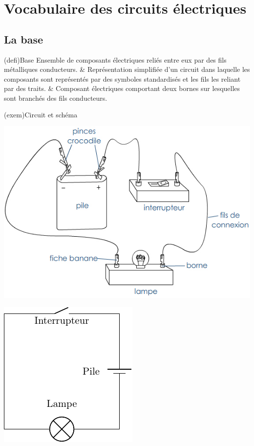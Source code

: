 \documentclass[../../main/main.tex]{subfiles}
\begin{document}
\section{Vocabulaire des circuits électriques}
\subsection{La base}
\begin{tcb}[label=def:circuits, tabularx={Y|Y|Y}](defi){Base}
	Ensemble de composants électriques reliés entre eux par des fils
	métalliques conducteurs. &
	Représentation simplifiée d'un circuit dans laquelle les composants sont
	représentés par des symboles standardisés et les fils les reliant par des
	traits. &
	Composant électriques comportant deux bornes sur lesquelles sont branchés
	des fils conducteurs.
\end{tcb}
\begin{tcb}[label=exem:circuits, sidebyside](exem){Circuit et schéma}
	\begin{center}
		\includegraphics[width=.7\linewidth]{circuit_simple_dessin.jpg}
	\end{center}
	\tcblower
	\begin{center}
		\includegraphics[width=.5\linewidth]{circuit_simple.pdf}
	\end{center}
\end{tcb}
\end{document}
